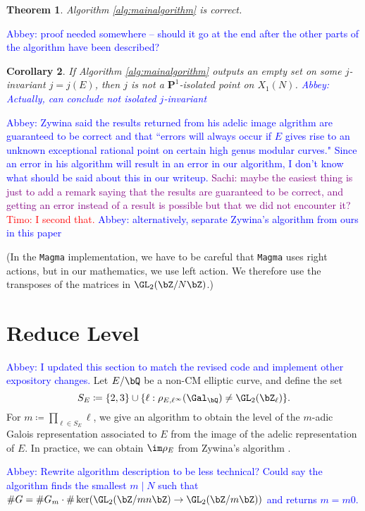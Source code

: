 \documentclass[11pt,reqno]{amsart}
\theoremstyle{plain}
\newtheorem{theorem}{Theorem}%
\newtheorem{corollary}[theorem]{Corollary}
\theoremstyle{definition}
\newcommand{\Q}{\bQ}
\newcommand{\Z}{\bZ}
\newcommand{\abbey}[1]{\textcolor{blue}{Abbey: #1}}
\newcommand{\sachi}[1]{\textcolor{purple}{Sachi: #1}}
\newcommand{\timo}[1]{\textcolor{red}{Timo: #1}}
\begin{document}
\begin{theorem}
 Algorithm \ref{alg:mainalgorithm} is correct. 
\end{theorem}
\abbey{proof needed somewhere -- should it go at the end after the other parts of the algorithm have been described?}
\begin{corollary}
If Algorithm \ref{alg:mainalgorithm} outputs an empty set on some $j$-invariant $j = j(E)$, then $j$ is not a  $\mathbf{P}^1$-isolated point on $X_1(N)$. \abbey{Actually, can conclude not isolated $j$-invariant}
\end{corollary}
\abbey{Zywina said the results returned from his adelic image algrithm are guaranteed to be correct and that ``errors will always occur if $E$ gives rise to an unknown exceptional rational point on certain high genus modular curves." Since an error in his algorithm will result in an error in our algorithm, I don't know what should be said about this in our writeup.} \sachi{maybe the easiest thing is just to add a remark saying that the results are guaranteed to be correct, and getting an error instead of a result is possible but that we did not encounter it?} \timo{I second that.} \abbey{alternatively, separate Zywina's algorithm from ours in this paper}

(In the \texttt{Magma} implementation, we have to be careful that \texttt{Magma} uses right actions, but in our mathematics, we use left action. We therefore use the transposes of the matrices in $\GL_2(\Z/N\Z)$.)


\section{Reduce Level}
\abbey{I updated this section to match the revised code and implement other expository changes.}
Let $E/\Q$ be a non-CM elliptic curve, and define the set 
\[
S_E\coloneqq \{2,3\} \cup \{ \ell: \rho_{E,\ell^{\infty}}(\Gal_{\Q}) \neq \GL_2(\Z_{\ell}) \}.
\] For $m \coloneqq \prod_{\ell \in S_E} \ell$, we give an algorithm to obtain the level of the $m$-adic Galois representation associated to $E$ from the image of the adelic representation of $E$. In practice, we can obtain $\im \rho_E$ from Zywina's algorithm \cite{ZywinaAlgorithm}.

\abbey{Rewrite algorithm description to be less technical? Could say the algorithm finds the smallest $m \mid N$ such that $\#G=\#G_m \cdot \#\ker(\GL_2(\Z/mn\Z) \rightarrow \GL_2(\Z/m\Z))$ and returns $m=m0$.}
\end{document}
